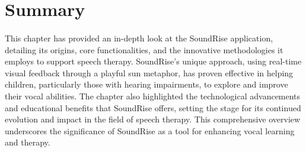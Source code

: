 \section{Summary}
\label{sec:summary}

\vspace{0.5cm}

\paragraph{}
This chapter has provided an in-depth look at the SoundRise application, detailing its origins, core functionalities, and the innovative methodologies it employs to support speech therapy. SoundRise's unique approach, using real-time visual feedback through a playful sun metaphor, has proven effective in helping children, particularly those with hearing impairments, to explore and improve their vocal abilities. The chapter also highlighted the technological advancements and educational benefits that SoundRise offers, setting the stage for its continued evolution and impact in the field of speech therapy. This comprehensive overview underscores the significance of SoundRise as a tool for enhancing vocal learning and therapy.



